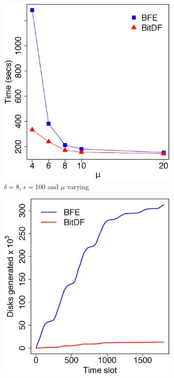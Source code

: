 \begin{figure}[h!]
    \begin{subfigure}[t]{0.48\textwidth}
        \includegraphics[width=\textwidth]{images/TDrive_l_8_g_100_varying_n.eps}
        \caption{$\delta = 8$, $\epsilon = 100$ and $\mu$ varying}
        \label{fig:tdrive_vary_n}
    \end{subfigure}
    \begin{subfigure}[t]{0.48\textwidth}
        \includegraphics[width=\textwidth]{images/TDrive_d.eps}

\end{subfigure}
\end{figure}
